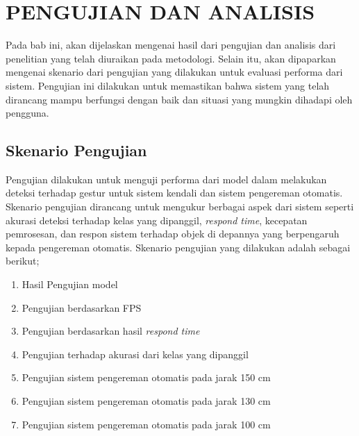 \chapter{PENGUJIAN DAN ANALISIS}
Pada bab ini, akan dijelaskan mengenai hasil dari pengujian dan analisis dari penelitian yang telah diuraikan pada metodologi. Selain itu, akan dipaparkan mengenai skenario dari pengujian yang dilakukan untuk evaluasi performa dari sistem. Pengujian ini dilakukan untuk memastikan bahwa sistem yang telah dirancang mampu berfungsi dengan baik dan situasi yang mungkin dihadapi oleh pengguna.
\section{Skenario Pengujian}
Pengujian dilakukan untuk menguji performa dari model dalam melakukan deteksi terhadap gestur untuk sistem kendali dan sistem pengereman otomatis. Skenario pengujian dirancang untuk mengukur berbagai aspek dari sistem seperti akurasi deteksi terhadap kelas yang dipanggil, \emph{respond time}, kecepatan pemrosesan, dan respon sistem terhadap objek di depannya yang berpengaruh kepada pengereman otomatis. Skenario pengujian yang dilakukan adalah sebagai berikut;
\begin{enumerate}
    \item Hasil Pengujian model
    \item Pengujian berdasarkan FPS
    \item Pengujian berdasarkan hasil \emph{respond time}
    \item Pengujian terhadap akurasi dari kelas yang dipanggil
    \item Pengujian sistem pengereman otomatis pada jarak 150 cm
    \item Pengujian sistem pengereman otomatis pada jarak 130 cm
    \item Pengujian sistem pengereman otomatis pada jarak 100 cm
\end{enumerate}
